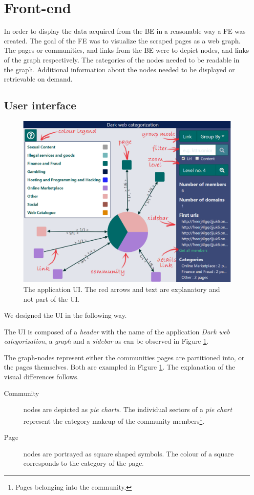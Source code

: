 \section{Front-end}
In order to display the data acquired from the BE in a reasonable way a FE was created. The goal of the FE was to visualize the scraped pages as a web graph. The pages or communities, and links from the BE were to depict nodes, and links of the graph respectively. The categories of the nodes needed to be readable in the graph. Additional information about the nodes needed to be displayed or retrievable on demand.

\subsection{User interface} \label{FEUI}
\begin{figure}[ht]
  \centering
  \includegraphics[width=\textwidth]{Images/basic_view.png}
  \caption{The application UI. The red arrows and text are explanatory and not part of the UI.}
  \label{MixedGraphBasic}
\end{figure}  
We designed the UI in the following way.

The UI is composed of a \textit{header} with the name of the application \textit{Dark web categorization}, a \textit{graph} and a \textit{sidebar} as can be observed in Figure \ref{MixedGraphBasic}. 

The graph-nodes represent either the communities pages are partitioned into, or the pages themselves. Both are exampled in Figure \ref{MixedGraphBasic}. The explanation of the visual differences follows.
\begin{description}
    \item[Community]  nodes are depicted as \textit{pie charts}. The individual sectors of a \textit{pie chart} represent the category makeup of the community members\footnote{Pages belonging into the community.}. 
    \item[Page] nodes are portrayed as square shaped symbols. The colour of a square corresponds to the category of the page.
\end{description}  

